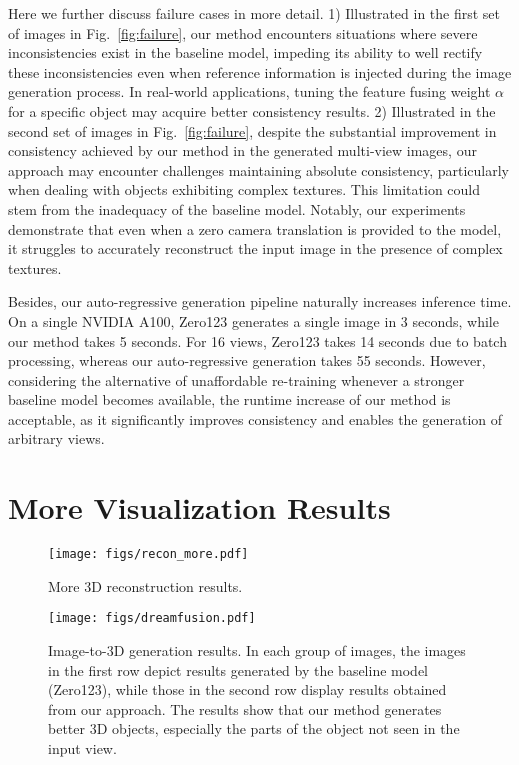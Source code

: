 Here we further discuss failure cases in more detail.
1) Illustrated in the first set of images in Fig.~\ref{fig:failure}, our method encounters situations where severe inconsistencies exist in the baseline model, impeding its ability to well rectify these inconsistencies even when reference information is injected during the image generation process. In real-world applications, tuning the feature fusing weight $\alpha$ for a specific object may acquire better consistency results.
2) Illustrated in the second set of images in Fig.~\ref{fig:failure}, despite the substantial improvement in consistency achieved by our method in the generated multi-view images, our approach may encounter challenges maintaining absolute consistency, particularly when dealing with objects exhibiting complex textures. This limitation could stem from the inadequacy of the baseline model. Notably, our experiments demonstrate that even when a zero camera translation is provided to the model, it struggles to accurately reconstruct the input image in the presence of complex textures.

Besides, our auto-regressive generation pipeline naturally increases inference time. On a single NVIDIA A100, Zero123 generates a single image in 3 seconds, while our method takes 5 seconds. For 16 views, Zero123 takes 14 seconds due to batch processing, whereas our auto-regressive generation takes 55 seconds. However, considering the alternative of unaffordable re-training whenever a stronger baseline model becomes available, the runtime increase of our method is acceptable, as it significantly improves consistency and enables the generation of arbitrary views.


\section{More Visualization Results}

\begin{figure*}[t]
    \centering
    \texttt{[image: figs/recon\_more.pdf]}
    \caption{More 3D reconstruction results.}
    \label{fig:more_recon}
\end{figure*}

\begin{figure*}[t]
    \centering
    \texttt{[image: figs/dreamfusion.pdf]}
    \caption{Image-to-3D generation results. In each group of images, the images in the first row depict results generated by the baseline model (Zero123), while those in the second row display results obtained from our approach. The results show that our method generates better 3D objects, especially the parts of the object not seen in the input view.}
    \label{fig:dreamfusion}
\end{figure*}

